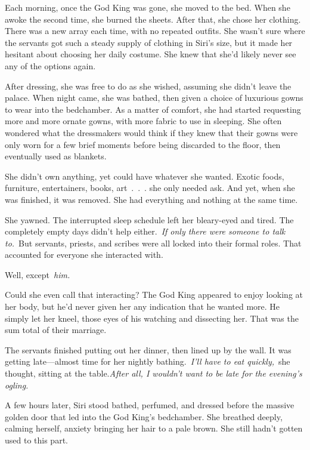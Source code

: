 Each morning, once the God King was gone, she moved to the bed. When she awoke the second time, she burned the sheets. After that, she chose her clothing. There was a new array each time, with no repeated outfits. She wasn’t sure where the servants got such a steady supply of clothing in Siri’s size, but it made her hesitant about choosing her daily costume. She knew that she’d likely never see any of the options again.

After dressing, she was free to do as she wished, assuming she didn’t leave the palace. When night came, she was bathed, then given a choice of luxurious gowns to wear into the bedchamber. As a matter of comfort, she had started requesting more and more ornate gowns, with more fabric to use in sleeping. She often wondered what the dressmakers would think if they knew that their gowns were only worn for a few brief moments before being discarded to the floor, then eventually used as blankets.

She didn’t own anything, yet could have whatever she wanted. Exotic foods, furniture, entertainers, books, art~.~.~. she only needed ask. And yet, when she was finished, it was removed. She had everything and nothing at the same time.

She yawned. The interrupted sleep schedule left her bleary-eyed and tired. The completely empty days didn’t help either.~\textit{If only there were someone to talk to.}~But servants, priests, and scribes were all locked into their formal roles. That accounted for everyone she interacted with.

Well, except~\textit{him.}

Could she even call that interacting? The God King appeared to enjoy looking at her body, but he’d never given her any indication that he wanted more. He simply let her kneel, those eyes of his watching and dissecting her. That was the sum total of their marriage.

The servants finished putting out her dinner, then lined up by the wall. It was getting late—almost time for her nightly bathing.~\textit{I’ll have to eat quickly,}~she thought, sitting at the table.\textit{After all, I wouldn’t want to be late for the evening’s ogling.}

\orn

A few hours later, Siri stood bathed, perfumed, and dressed before the massive golden door that led into the God King’s bedchamber. She breathed deeply, calming herself, anxiety bringing her hair to a pale brown. She still hadn’t gotten used to this part.

